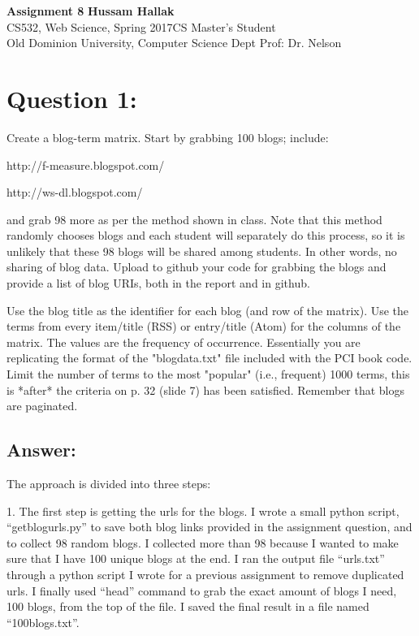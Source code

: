 \documentclass[a4paper, 11pt]{article}
\begin{document}
\noindent
\large\textbf{Assignment 8} \hfill \textbf{Hussam Hallak} \\
\normalsize CS532, Web Science, Spring 2017\hfill CS Master's Student \\
Old Dominion University, Computer Science Dept \hfill Prof: Dr. Nelson 

\section*{Question 1:}
Create a blog-term matrix.  Start by grabbing 100 blogs; include:

http://f-measure.blogspot.com/

http://ws-dl.blogspot.com/

and grab 98 more as per the method shown in class.  Note that this
method randomly chooses blogs and each student will separately do
this process, so it is unlikely that these 98 blogs will be shared
among students.  In other words, no sharing of blog data.  Upload
to github your code for grabbing the blogs and provide a list of
blog URIs, both in the report and in github.

Use the blog title as the identifier for each blog (and row of the
matrix).  Use the terms from every item/title (RSS) or entry/title
(Atom) for the columns of the matrix.  The values are the frequency
of occurrence.  Essentially you are replicating the format of the
"blogdata.txt" file included with the PCI book code.  Limit the
number of terms to the most "popular" (i.e., frequent) 1000 terms,
this is *after* the criteria on p. 32 (slide 7) has been satisfied.
Remember that blogs are paginated.  

\subsection*{Answer:}
The approach is divided into three steps:

1. The first step is getting the urls for the blogs. I wrote a small python script, ``getblogurls.py'' to save both blog links provided in the assignment question, and to collect 98 random blogs. I collected more than 98 because I wanted to make sure that I have 100 unique blogs at the end. I ran the output file ``urls.txt'' through a python script I wrote for a previous assignment to remove duplicated urls. I finally used ``head'' command to grab the exact amount of blogs I need, 100 blogs, from the top of the file. I saved the final result in a file named ``100blogs.txt''.
 
\end{document}
